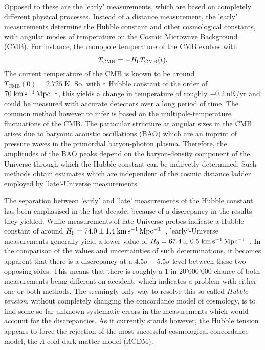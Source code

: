 Opposed to these are the 'early' measurements, which are based on completely
different physical processes.  Instead of a distance measurement, the 'early'
measurements determine the Hubble constant and other cosmological constants,
with angular modes of temperature on the Cosmic Microwave Background (CMB).  For
instance, the monopole temperature of the CMB evolves with
%
\begin{equation}
    \dot{T}_{\text{CMB}} = -H_{0}{}T_{\text{CMB}}(t).
\end{equation}
%
The current temperature of the CMB is known to be around $T_{\text{CMB}}(0) =
2.725\;\mathrm{K}$. So, with a Hubble constant of the order of
$70\;\mathrm{km\,s^{-1}\,Mpc^{-1}}{}$, this yields a change in temperature of roughly
$-0.2\;\mathrm{nK/yr}$ and could be measured with accurate detectors over a long
period of time.  The common method however to infer \Ho{} is based on the
multipole-temperature fluctuations of the CMB.  The particular structure at
angular sizes in the CMB arises due to baryonic acoustic oscillations (BAO)
which are an imprint of pressure waves in the primordial baryon-photon plasma.
Therefore, the amplitudes of the BAO peaks depend on the baryon-density
component of the Universe through which the Hubble constant can be indirectly
determined.  Such methods obtain estimates which are independent of the cosmic
distance ladder employed by 'late'-Universe measurements.

The separation between 'early' and 'late' measurements of the Hubble constant
has been emphasised in the last decade, because of a discrepancy in the results
they yielded.  While measurements of late-Universe probes indicate a Hubble
constant of around $H_{0} = 74.0 \pm 1.4\;\mathrm{km\,s^{-1}\,Mpc^{-1}}$~, 'early'-Universe
measurements generally yield a lower value of $H_{0} = 67.4 \pm
0.5\;\mathrm{km\,s^{-1}\,Mpc^{-1}}$~.  In the comparison of the
values and uncertainties of such determinations, it becomes apparent that there
is a discrepancy at a $4.5\sigma-5.5\sigma$-level between these two opposing sides.  This means
that there is roughly a 1 in 20'000'000 chance of both measurements being
different on accident, which indicates a problem with either one or both
methods.  The seemingly only way to resolve this so-called \textit{Hubble
tension}, without completely changing the concordance model of cosmology, is to
find some so-far unknown systematic errors in the measurements which would
account for the discrepancies.  As it currently stands however, the Hubble
tension appears to force the rejection of the most successful cosmological
concordance model, the $\Lambda$ cold-dark matter model ($\Lambda$CDM). 

